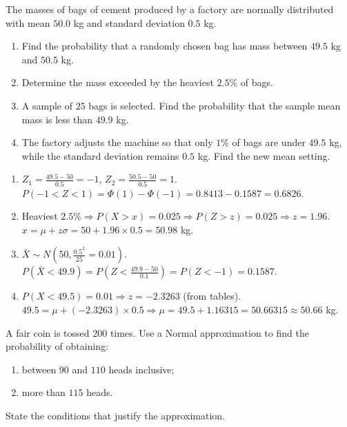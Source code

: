 \documentclass[11pt]{article}
\begin{document}
\begin{exercice}
The masses of bags of cement produced by a factory are normally distributed with mean $50.0$ kg and standard deviation $0.5$ kg.
\begin{enumerate}
\item Find the probability that a randomly chosen bag has mass between $49.5$ kg and $50.5$ kg.
\item Determine the mass exceeded by the heaviest $2.5\%$ of bags.
\item A sample of $25$ bags is selected. Find the probability that the sample mean mass is less than $49.9$ kg.
\item The factory adjusts the machine so that only $1\%$ of bags are under $49.5$ kg, while the standard deviation remains $0.5$ kg. Find the new mean setting.
\end{enumerate}
\end{exercice}

\begin{corrige}[Exercise 3]
\begin{enumerate}
\item $Z_1=\frac{49.5-50}{0.5}=-1$, $Z_2=\frac{50.5-50}{0.5}=1$. $P(-1<Z<1)=\Phi(1)-\Phi(-1)=0.8413-0.1587=0.6826$.
\item Heaviest $2.5\% \Rightarrow P(X>x)=0.025 \Rightarrow P(Z>z)=0.025 \Rightarrow z=1.96$. $x=\mu+z\sigma=50+1.96\times0.5=50.98$ kg.
\item $\bar{X}\sim N(50, \frac{0.5^2}{25}=0.01)$. $P(\bar{X}<49.9)=P\left(Z<\frac{49.9-50}{0.1}\right)=P(Z<-1)=0.1587$.
\item $P(X<49.5)=0.01 \Rightarrow z=-2.3263$ (from tables). $49.5=\mu+(-2.3263)\times0.5 \Rightarrow \mu=49.5+1.16315=50.66315\approx 50.66$ kg.
\end{enumerate}
\end{corrige}

\begin{exercice}
A fair coin is tossed $200$ times. Use a Normal approximation to find the probability of obtaining:
\begin{enumerate}
\item between $90$ and $110$ heads inclusive;
\item more than $115$ heads.
\end{enumerate}
State the conditions that justify the approximation.
\end{exercice}
\end{document}
